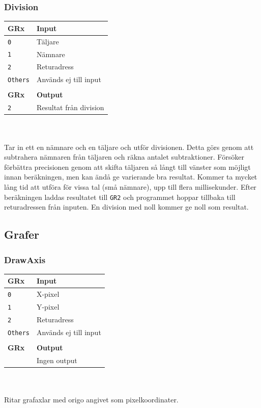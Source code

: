 \documentclass[]{article}
\begin{document}
\subsubsection{Division}
\begin{tabular}{ll}
	\textbf{GRx}    & \textbf{Input}         \\ \hline
	\texttt{0}      & Täljare                \\
	\texttt{1}      & Nämnare                \\
	\texttt{2}      & Returadress            \\
	\texttt{Others} & Används ej till input  \\
	                &  \\
	\textbf{GRx}    & \textbf{Output}        \\ \hline
	\texttt{2}      & Resultat från division
\end{tabular}
\\\\
\noindent
Tar in ett en nämnare och en täljare och utför divisionen. Detta görs genom att subtrahera nämnaren från täljaren och räkna antalet subtraktioner. Försöker förbättra precisionen genom att skifta täljaren så långt till vänster som möjligt innan beräkningen, men kan ändå ge varierande bra resultat. Kommer ta mycket lång tid att utföra för vissa tal (små nämnare), upp till flera millisekunder. Efter beräkningen laddas resultatet till \texttt{GR2} och programmet hoppar tillbaka till returadressen från inputen. En division med noll kommer ge noll som resultat.

\subsection{Grafer}

\subsubsection{DrawAxis}
\begin{tabular}{ll}
	\textbf{GRx}    & \textbf{Input}        \\ \hline
	\texttt{0}      & X-pixel               \\
	\texttt{1}      & Y-pixel               \\
	\texttt{2}      & Returadress           \\
	\texttt{Others} & Används ej till input \\
	             &  \\
	\textbf{GRx} & \textbf{Output}              \\ \hline
	             & Ingen output
\end{tabular}
\\\\
\noindent
Ritar grafaxlar med origo angivet som pixelkoordinater.
\end{document}
